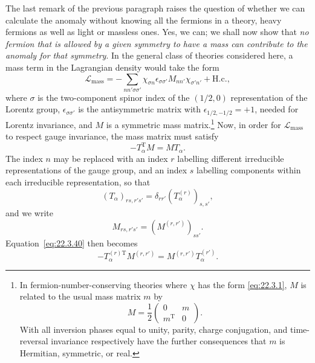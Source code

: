 The last remark of the previous paragraph raises the question of whether
we can calculate the anomaly without knowing all the fermions in a theory,
heavy fermions as well as light or massless ones. Yes, we can; we shall now
show that \emph{no fermion that is allowed by a given symmetry to have a
mass can contribute to the anomaly for that symmetry}. In the general
class of theories considered here, a mass term in the Lagrangian density
would take the form
\begin{equation}
 \mathcal L_{\mathrm{mass}}
 =-\sum_{nn'\sigma\sigma'}
 \chi_{\sigma n}\epsilon_{\sigma\sigma'}M_{nn'}\chi_{\sigma'n'}
 +\mathrm{H.c.},
 \tag{22.3.39}\label{eq:22.3.39}
\end{equation}
where $\sigma$ is the two-component spinor index of the $(1/2,0)$
representation of the Lorentz group, $\epsilon_{\sigma\sigma'}$ is the
antisymmetric matrix with $\epsilon_{1/2,-1/2}=+1$, needed for Lorentz
invariance, and $M$ is a symmetric mass matrix.\footnote{In
fermion-number-conserving theories where $\chi$ has the form
\eqref{eq:22.3.1}, $M$ is related to the usual mass matrix $m$ by
\[
 M=\frac12
 \begin{pmatrix}
  0&m\\
  m^{\mathrm T}&0
 \end{pmatrix}.
\]
With all inversion phases equal to unity, parity, charge conjugation, and
time-reversal invariance respectively have the further consequences that
$m$ is Hermitian, symmetric, or real.} Now, in order for
$\mathcal L_{\mathrm{mass}}$ to respect gauge invariance, the mass matrix
must satisfy
\begin{equation}
 -T_\alpha^{\mathrm T}M=MT_\alpha.
 \tag{22.3.40}\label{eq:22.3.40}
\end{equation}
The index $n$ may be replaced with an index $r$ labelling different
irreducible representations of the gauge group, and an index $s$ labelling
components within each irreducible representation, so that
\begin{equation}
 (T_\alpha)_{rs,r's'}=\delta_{rr'}(T_\alpha^{(r)})_{s,s'},
 \tag{22.3.41}\label{eq:22.3.41}
\end{equation}
and we write
\begin{equation}
 M_{rs,r's'}=(M^{(r,r')})_{ss'}.
 \tag{22.3.42}\label{eq:22.3.42}
\end{equation}
Equation~\eqref{eq:22.3.40} then becomes
\begin{equation}
 -T_\alpha^{(r)\mathrm T}M^{(r,r')}
 =M^{(r,r')}T_\alpha^{(r')}.
 \tag{22.3.43}\label{eq:22.3.43}
\end{equation}
